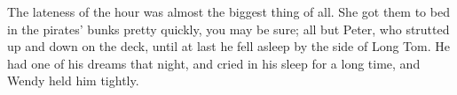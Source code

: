 The lateness of the hour was almost the biggest thing of all.
She got them to bed in the pirates’ bunks pretty quickly, you may be sure;
all but Peter, who strutted up and down on the deck,
until at last he fell asleep by the side of Long Tom.
He had one of his dreams that night,
and cried in his sleep for a long time, and Wendy held him tightly.

\endinput
